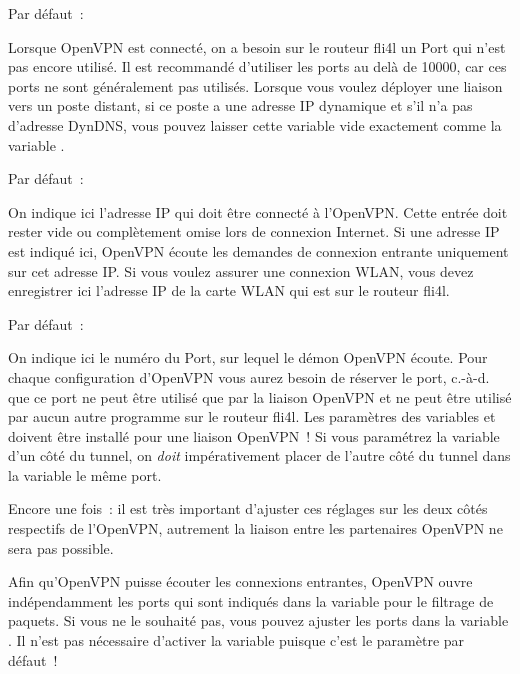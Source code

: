 \begin{description}

  Par défaut~: 

  Lorsque OpenVPN est connecté, on a besoin sur le routeur fli4l un Port qui n'est pas
  encore utilisé. Il est recommandé d'utiliser les ports au delà de 10000, car ces ports
  ne sont généralement pas utilisés. Lorsque vous voulez déployer une liaison vers un
  poste distant, si ce poste a une adresse IP dynamique et s'il n'a pas d'adresse DynDNS,
  vous pouvez laisser cette variable vide exactement comme la variable .


  Par défaut~: 

  On indique ici l'adresse IP qui doit être connecté à l'OpenVPN. Cette entrée doit
  rester vide ou complètement omise lors de connexion Internet. Si une adresse IP est
  indiqué ici, OpenVPN écoute les demandes de connexion entrante uniquement sur cet
  adresse IP. Si vous voulez assurer une connexion WLAN, vous devez enregistrer ici
  l'adresse IP de la carte WLAN qui est sur le routeur fli4l.


  Par défaut~: 

  On indique ici le numéro du Port, sur lequel le démon OpenVPN écoute. Pour chaque
  configuration d'OpenVPN vous aurez besoin de réserver le port, c.-à-d. que ce port ne
  peut être utilisé que par la liaison OpenVPN et ne peut être utilisé par aucun autre
  programme sur le routeur fli4l. Les paramètres des variables 
   et  doivent être installé
  pour une liaison OpenVPN~! Si vous paramétrez la variable 
  d'un côté du tunnel, on \emph{doit} impérativement placer de l'autre côté du tunnel
  dans la variable  le même port.

  Encore une fois~: il est très important d'ajuster ces réglages sur les deux côtés respectifs
  de l'OpenVPN, autrement la liaison entre les partenaires OpenVPN ne sera pas possible.

  Afin qu'OpenVPN puisse écouter les connexions entrantes, OpenVPN ouvre indépendamment
  les ports qui sont indiqués dans la variable  pour le
  filtrage de paquets. Si vous ne le souhaité pas, vous pouvez ajuster les ports dans
  la variable .
  Il n'est pas nécessaire d'activer la variable 
  puisque c'est le paramètre par défaut~!


\end{description}
